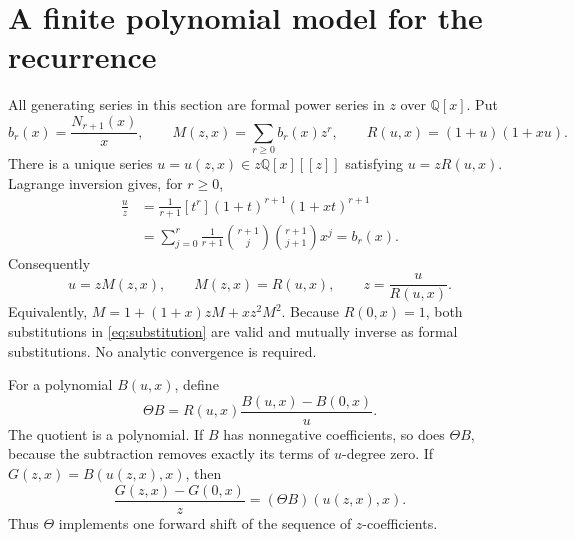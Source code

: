 \documentclass[11pt,letterpaper]{article}
\theoremstyle{definition}
\theoremstyle{remark}
\newcommand{\QQ}{\mathbb{Q}}
\begin{document}
\section{A finite polynomial model for the recurrence}
All generating series in this section are formal power series in $z$ over $\QQ[x]$. Put
\[
 b_r(x)=\frac{N_{r+1}(x)}x,\qquad
 M(z,x)=\sum_{r\geq0}b_r(x)z^r,\qquad
 R(u,x)=(1+u)(1+xu).
\]
There is a unique series $u=u(z,x)\in z\QQ[x][[z]]$ satisfying $u=zR(u,x)$. Lagrange inversion gives, for $r\geq0$,
\begin{align*}
 [z^r]\frac{u}{z}
 &=\frac1{r+1}[t^r](1+t)^{r+1}(1+xt)^{r+1}\\
 &=\sum_{j=0}^r\frac1{r+1}
       \binom{r+1}{j}\binom{r+1}{j+1}x^j
 =b_r(x).
\end{align*}
Consequently
\begin{equation}\label{eq:substitution}
 u=zM(z,x),\qquad M(z,x)=R(u,x),\qquad z=\frac{u}{R(u,x)}.
\end{equation}
Equivalently, $M=1+(1+x)zM+xz^2M^2$. Because $R(0,x)=1$, both substitutions in \eqref{eq:substitution} are valid and mutually inverse as formal substitutions. No analytic convergence is required.

For a polynomial $B(u,x)$, define
\begin{equation}\label{eq:theta}
 \Theta B=R(u,x)\frac{B(u,x)-B(0,x)}u.
\end{equation}
The quotient is a polynomial. If $B$ has nonnegative coefficients, so does $\Theta B$, because the subtraction removes exactly its terms of $u$-degree zero. If $G(z,x)=B(u(z,x),x)$, then
\begin{equation}\label{eq:shift}
 \frac{G(z,x)-G(0,x)}z=(\Theta B)(u(z,x),x).
\end{equation}
Thus $\Theta$ implements one forward shift of the sequence of $z$-coefficients.
\end{document}
